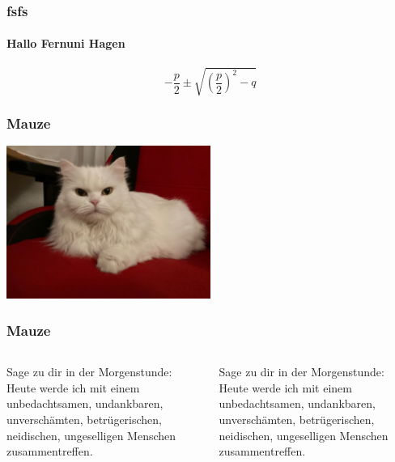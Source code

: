 \documentclass[12pt,ngerman,aspectratio=169]{beamer}
\begin{document}
\begin{frame}
\frametitle{fsfs}
\framesubtitle{Hallo Fernuni Hagen}



\begin{equation}
-\frac{p}{2} \pm \sqrt{  \left(\frac{p}{2}\right)^2 - q  }
\end{equation}

\end{frame}

\begin{frame}
\frametitle{Mauze}

\begin{center}
\includegraphics[width=0.5\textwidth]{../Bilder/Katze}
\end{center}

\end{frame}

\begin{frame}
\frametitle{Mauze}

\begin{columns}
\begin{column}{0.495\textwidth}
Sage zu dir in der Morgenstunde: Heute werde ich mit einem unbedachtsamen, undankbaren, unverschämten, betrügerischen, neidischen, ungeselligen Menschen zusammentreffen. 
\end{column}
\begin{column}{0.495\textwidth}
Sage zu dir in der Morgenstunde: Heute werde ich mit einem unbedachtsamen, undankbaren, unverschämten, betrügerischen, neidischen, ungeselligen Menschen zusammentreffen. 
\end{column}

\end{columns}
\end{frame}
\end{document}
